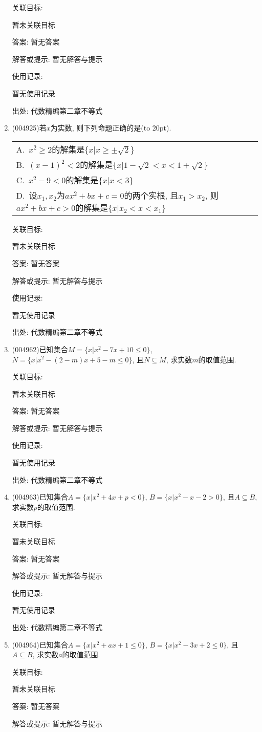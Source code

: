 \documentclass[10pt,a4paper]{article}
\newcommand{\bracket}[1]{(\hbox to #1pt{})}
\newcommand{\onech}[4]{\par\begin{tabular}{p{.9\textwidth}}
A.~#1\\
B.~#2\\
C.~#3\\
D.~#4
\end{tabular}}
\begin{document}
\begin{enumerate}[1.]
关联目标:

暂未关联目标

答案: 暂无答案

解答或提示: 暂无解答与提示

使用记录:

暂无使用记录


出处: 代数精编第二章不等式
\item { (004925)}若$x$为实数, 则下列命题正确的是\bracket{20}.
\onech{$x^2\ge 2$的解集是$\{x|x\ge \pm \sqrt 2\}$}{$(x-1)^2<2$的解集是$\{x|1-\sqrt 2<x<1+\sqrt 2\}$}{$x^2-9<0$的解集是$\{x|x<3\}$}{设$x_1,x_2$为$ax^2+bx+c=0$的两个实根, 且$x_1>x_2$, 则$ax^2+bx+c>0$的解集是$\{x|x_2<x<x_1\}$}


关联目标:

暂未关联目标

答案: 暂无答案

解答或提示: 暂无解答与提示

使用记录:

暂无使用记录


出处: 代数精编第二章不等式
\item { (004962)}已知集合$M=\{x|x^2-7x+10\le 0\}$, $N=\{x|x^2-(2-m)x+5-m\le 0\}$, 且$N\subseteq M$, 求实数$m$的取值范围.


关联目标:

暂未关联目标

答案: 暂无答案

解答或提示: 暂无解答与提示

使用记录:

暂无使用记录


出处: 代数精编第二章不等式
\item { (004963)}已知集合$A=\{x|x^2+4x+p<0\}$, $B=\{x|x^2-x-2>0\}$, 且$A\subseteq B$, 求实数$p$的取值范围.


关联目标:

暂未关联目标

答案: 暂无答案

解答或提示: 暂无解答与提示

使用记录:

暂无使用记录


出处: 代数精编第二章不等式
\item { (004964)}已知集合$A=\{x|x^2+ax+1\le 0\}$, $B=\{x|x^2-3x+2\le 0\}$, 且$A\subseteq B$, 求实数$a$的取值范围.


关联目标:

暂未关联目标

答案: 暂无答案

解答或提示: 暂无解答与提示


\end{enumerate}
\end{document}
